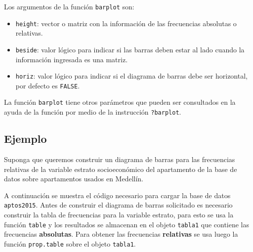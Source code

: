 \documentclass[10pt,]{krantz}
\makeatletter
\newenvironment{Shaded}{\begin{snugshade}}{\end{snugshade}}
\newcommand{\KeywordTok}[1]{\textcolor[rgb]{0.13,0.29,0.53}{\textbf{{#1}}}}
\newcommand{\DataTypeTok}[1]{\textcolor[rgb]{0.13,0.29,0.53}{{#1}}}
\newcommand{\StringTok}[1]{\textcolor[rgb]{0.31,0.60,0.02}{{#1}}}
\newcommand{\NormalTok}[1]{{#1}}
\providecommand{\tightlist}{%
  \setlength{\itemsep}{0pt}\setlength{\parskip}{0pt}}
\newenvironment{kframe}{%
\medskip{}
\setlength{\fboxsep}{.8em}
 \def\at@end@of@kframe{}%
 \ifinner\ifhmode%
  \def\at@end@of@kframe{\end{minipage}}%
  \begin{minipage}{\columnwidth}%
 \fi\fi%
 \def\FrameCommand##1{\hskip\@totalleftmargin \hskip-\fboxsep
 \colorbox{shadecolor}{##1}\hskip-\fboxsep
     \hskip-\linewidth \hskip-\@totalleftmargin \hskip\columnwidth}%
 \MakeFramed {\advance\hsize-\width
   \@totalleftmargin\z@ \linewidth\hsize
   \@setminipage}}%
 {\par\unskip\endMakeFramed%
 \at@end@of@kframe}
\renewenvironment{Shaded}{\begin{kframe}}{\end{kframe}}
\makeatother
\begin{document}
Los argumentos de la función \texttt{barplot} son:

\begin{itemize}
\tightlist
\item
  \texttt{height}: vector o matriz con la información de las frecuencias
  absolutas o relativas.
\item
  \texttt{beside}: valor lógico para indicar si las barras deben estar
  al lado cuando la información ingresada es una matriz.
\item
  \texttt{horiz}: valor lógico para indicar si el diagrama de barras
  debe ser horizontal, por defecto es \texttt{FALSE}.
\end{itemize}

La función \texttt{barplot} tiene otros parámetros que pueden ser
consultados en la ayuda de la función por medio de la instrucción
\texttt{?barplot}.

\subsection*{Ejemplo}\label{ejemplo-17}


Suponga que queremos construir un diagrama de barras para las
frecuencias relativas de la variable estrato socioeconómico del
apartamento de la base de datos sobre apartamentos usados en Medellín.

A continuación se muestra el código necesario para cargar la base de
datos \texttt{aptos2015}. Antes de construir el diagrama de barras
solicitado es necesario construir la tabla de frecuencias para la
variable estrato, para esto se usa la función \texttt{table} y los
resultados se almacenan en el objeto \texttt{tabla1} que contiene las
frecuencias \textbf{absolutas}. Para obtener las frecuencias
\textbf{relativas} se usa luego la función \texttt{prop.table} sobre el
objeto \texttt{tabla1}.

\begin{Shaded}
\end{Shaded}
\end{document}
